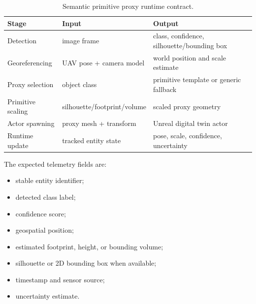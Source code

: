 ﻿\documentclass[11pt,a4paper]{article}
\begin{document}
\begin{table}[h]
\centering
\caption{Semantic primitive proxy runtime contract.}
\label{tab:runtime-contract}
\begin{tabular}{@{}lll@{}}
\toprule
Stage & Input & Output \\
\midrule
Detection & image frame & class, confidence, silhouette/bounding box \\
Georeferencing & UAV pose + camera model & world position and scale estimate \\
Proxy selection & object class & primitive template or generic fallback \\
Primitive scaling & silhouette/footprint/volume & scaled proxy geometry \\
Actor spawning & proxy mesh + transform & Unreal digital twin actor \\
Runtime update & tracked entity state & pose, scale, confidence, uncertainty \\
\bottomrule
\end{tabular}
\end{table}

The expected telemetry fields are:

\begin{itemize}
    \item stable entity identifier;
    \item detected class label;
    \item confidence score;
    \item geospatial position;
    \item estimated footprint, height, or bounding volume;
    \item silhouette or 2D bounding box when available;
    \item timestamp and sensor source;
    \item uncertainty estimate.
\end{itemize}
\end{document}
